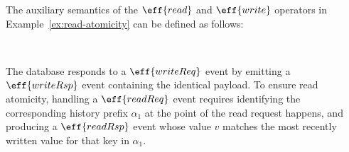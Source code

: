 \begin{example}\label{ex:aux-semantics}
  The auxiliary semantics of the $\eff{read}$ and $\eff{write}$ operators in Example~\ref{ex:read-atomicity} can be defined as follows:

  {\footnotesize
    \quad
    \\[-0.1em]
    }\noindent

  \noindent
  The database responds to a $\eff{writeReq}$ event by emitting a
  $\eff{writeRsp}$ event containing the identical payload. To ensure
  read atomicity, handling a $\eff{readReq}$ event requires
  identifying the corresponding history prefix $\alpha_1$ at the point
  of the read request happens, and producing a $\eff{readRsp}$ event
  whose value $v$ matches the most recently written value for that key
  in $\alpha_1$.
\end{example}

